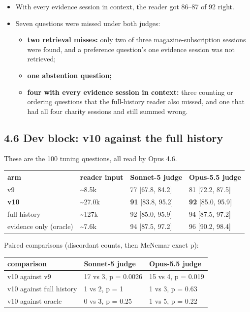 \documentclass[11pt]{article}
\providecommand{\tightlist}{\setlength{\itemsep}{0pt}\setlength{\parskip}{0pt}}
\begin{document}
\begin{itemize}
\tightlist
\item
  With every evidence session in context, the reader got 86--87 of 92 right.
\item
  Seven questions were missed under both judges:

  \begin{itemize}
  \tightlist
  \item
    \textbf{two retrieval misses:} only two of three magazine-subscription sessions were found, and a preference
    question's one evidence session was not retrieved;
  \item
    \textbf{one abstention question;}
  \item
    \textbf{four with every evidence session in context:} three counting or ordering questions that the
    full-history reader also missed, and one that had all four charity sessions and still summed wrong.
  \end{itemize}
\end{itemize}

\hypertarget{dev-block-v10-against-the-full-history}{%
\subsection{4.6 Dev block: v10 against the full history}\label{dev-block-v10-against-the-full-history}}

These are the 100 tuning questions, all read by Opus 4.6.

\begin{longtable}[]{@{}llll@{}}
\toprule\noalign{}
arm & reader input & Sonnet-5 judge & Opus-5.5 judge \\
\midrule\noalign{}
\endhead
\bottomrule\noalign{}
\endlastfoot
v9 & \textasciitilde8.5k & 77 {[}67.8, 84.2{]} & 81 {[}72.2, 87.5{]} \\
\textbf{v10} & \textasciitilde27.0k & \textbf{91} {[}83.8, 95.2{]} & \textbf{92} {[}85.0, 95.9{]} \\
full history & \textasciitilde127k & 92 {[}85.0, 95.9{]} & 94 {[}87.5, 97.2{]} \\
evidence only (oracle) & \textasciitilde7.6k & 94 {[}87.5, 97.2{]} & 96 {[}90.2, 98.4{]} \\
\end{longtable}

Paired comparisons (discordant counts, then McNemar exact p):

\begin{longtable}[]{@{}lll@{}}
\toprule\noalign{}
comparison & Sonnet-5 judge & Opus-5.5 judge \\
\midrule\noalign{}
\endhead
\bottomrule\noalign{}
\endlastfoot
v10 against v9 & 17 vs 3, p = 0.0026 & 15 vs 4, p = 0.019 \\
v10 against full history & 1 vs 2, p = 1 & 1 vs 3, p = 0.63 \\
v10 against oracle & 0 vs 3, p = 0.25 & 1 vs 5, p = 0.22 \\
\end{longtable}
\end{document}
